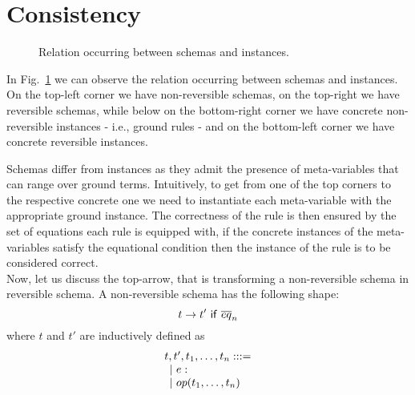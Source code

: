 \documentclass{article}[12pt,a4paper]
\theoremstyle{definition}
\begin{document}
\section{Consistency}

\begin{figure}
  \centering
  \caption{ Relation occurring between schemas and instances. }
  \label{fig:square}
\end{figure}

In Fig.~\ref{fig:square} we can observe the relation occurring between schemas
and instances. On the top-left corner we have non-reversible schemas, on the
top-right we have reversible schemas, while below on the
bottom-right corner we have concrete non-reversible instances - i.e., ground
rules - and on the bottom-left corner we have concrete reversible instances.

Schemas differ from instances as they admit the presence of meta-variables that
can range over ground terms. Intuitively, to get from one of the top corners to
the respective concrete one we need to instantiate each meta-variable with
the appropriate ground instance. The correctness of the rule is then ensured by
the set of equations each rule is equipped with, if the concrete instances of
the meta-variables satisfy the equational condition then the instance of the
rule is to be considered correct.\\

Now, let us discuss the top-arrow, that is transforming a non-reversible schema in reversible
schema. A non-reversible schema has the following shape:
\[t \rightarrow t'~\mathsf{if}~\overline{eq}_n\]
where $t$ and $t'$ are inductively defined as
\[
  \begin{array}{l}
    t,t',t_1,\ldots,t_n: ::=\\
    \hspace{1ex}|~e:\\
    \hspace{1ex}|~op(t_1,\ldots,t_n)\\
  \end{array}
\]
\end{document}
